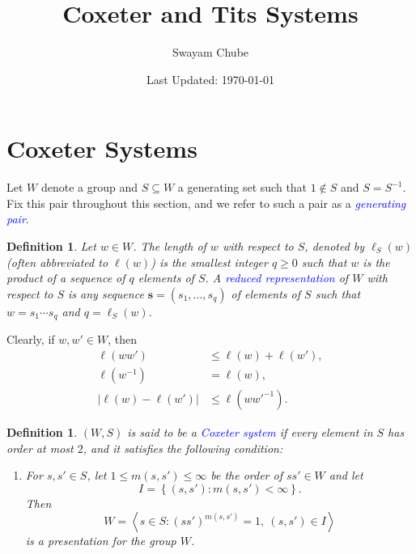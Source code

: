 \documentclass{article}
\title{Coxeter and Tits Systems}
\author{Swayam Chube}
\date{Last Updated: \today}
\theoremstyle{thmstyle}
\theoremstyle{defstyle}
\newtheorem{definition}[theorem]{Definition}
\newcommand{\define}[1]{\textcolor{blue}{\textit{#1}}}
\renewcommand{\le}{\leqslant}
\renewcommand{\ge}{\geqslant}
\begin{document}
\maketitle

\section{Coxeter Systems}

Let $W$ denote a group and $S\subseteq W$ a generating set such that $1\notin S$ and $S = S^{-1}$. Fix this pair throughout this section, and we refer to such a pair as a \define{generating pair}.

\begin{definition}
    Let $w\in W$. The length of $w$ with respect to $S$, denoted by $\ell_S(w)$ (often abbreviated to $\ell(w)$) is the smallest integer $q\ge 0$ such that $w$ is the product of a sequence of $q$ elements of $S$. A \define{reduced representation} of $W$ with respect to $S$ is any sequence $\mathbf s = (s_1,\dots,s_q)$ of elements of $S$ such that $w = s_1\cdots s_q$ and $q = \ell_S(w)$.
\end{definition}

Clearly, if $w, w'\in W$, then 
\begin{align*}
    \ell(ww') &\le\ell(w) + \ell(w'),\\
    \ell(w^{-1}) &= \ell(w),\\
    \left|\ell(w) - \ell(w')\right|&\le\ell(ww'^{-1}).
\end{align*}

\begin{definition}
    $(W, S)$ is said to be a \define{Coxeter system} if every element in $S$ has order at most $2$, and it satisfies the following condition: 
    \begin{enumerate}[label=(Cox)]
        \item For $s, s'\in S$, let $1\le m(s, s')\le\infty$ be the order of $ss'\in W$ and let 
        \begin{equation*}
            I = \left\{(s, s')\colon m(s, s') < \infty\right\}.
        \end{equation*}
        Then 
        \begin{equation*}
            W = \left\langle s\in S\colon (ss')^{m(s, s')} = 1,~(s, s')\in I\right\rangle
        \end{equation*}
        is a presentation for the group $W$.\label{coxeter}
    \end{enumerate}
\end{definition}
\end{document}
